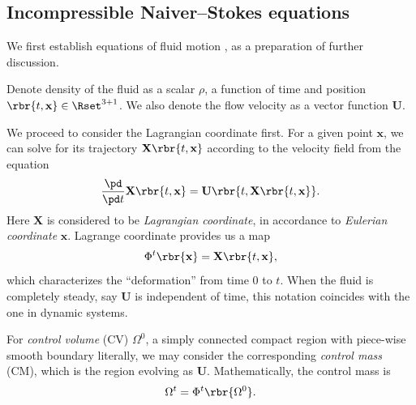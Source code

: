 \documentclass[english, nochinese]{pkupaper}
\begin{document}
\subsection{Incompressible Naiver--Stokes equations}

We first establish equations of fluid motion \parencite{pope_turbulent_2001} \parencite{ferziger_computational_2002}, as a preparation of further discussion.

Denote density of the fluid as a scalar $\rho$, a function of time and position $ \rbr{ t, \mathbf{x} } \in \Rset^{ 3 + 1 } $. We also denote the flow velocity as a vector function $\mathbf{U}$.

We proceed to consider the Lagrangian coordinate first. For a given point $\mathbf{x}$, we can solve for its trajectory $ \mathbf{X} \rbr{ t, \mathbf{x} } $ according to the velocity field from the equation
\begin{equation}
\frac{\pd}{ \pd t } \mathbf{X} \rbr{ t, \mathbf{x} } = \mathbf{U} \rbr{ t, \mathbf{X} \rbr{ t, \mathbf{x} } }.
\end{equation}
Here $\mathbf{X}$ is considered to be \emph{Lagrangian coordinate}, in accordance to \emph{Eulerian coordinate} $\mathbf{x}$. Lagrange coordinate provides us a map
\begin{equation}
\Phi^t \rbr{\mathbf{x}} = \mathbf{X} \rbr{ t, \mathbf{x} },
\end{equation}
which characterizes the ``deformation'' from time $0$ to $t$. When the fluid is completely steady, say $\mathbf{U}$ is independent of time, this notation coincides with the one in dynamic systems.

For \emph{control volume} (CV) $\Omega^0$, a simply connected compact region with piece-wise smooth boundary literally, we may consider the corresponding \emph{control mass} (CM), which is the region evolving as $\mathbf{U}$. Mathematically, the control mass is
\begin{equation}
\Omega^t = \Phi^t \rbr{\Omega^0}.
\end{equation}
\end{document}
